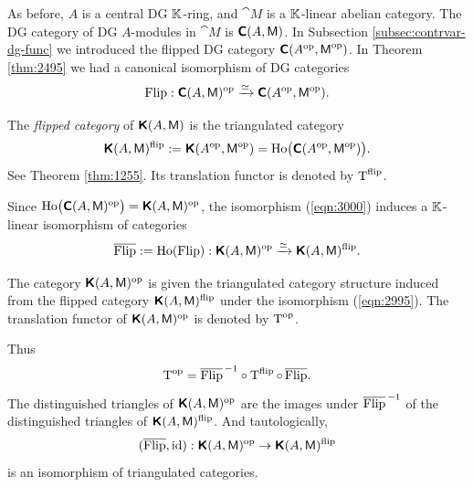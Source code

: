 As before, $A$ is a central DG $\mathbb{K}$-ring, and $\cat{M}$ is a $\mathbb{K}$-linear 
abelian category. The DG category of DG $A$-modules in $\cat{M}$ is 
$\boldsymbol{\mathsf{C}}(A, \operatorname{\mathsf{M}})$. 
In Subsection \ref{subsec:contrvar-dg-func} we introduced the flipped DG 
category 
$\boldsymbol{\mathsf{C}}(A^{\mathrm{op}}, \operatorname{\mathsf{M}}^{\mathrm{op}})$. 
In Theorem \ref{thm:2495} we had a canonical isomorphism of DG categories
\begin{equation} \label{eqn:3000}
\operatorname{Flip} : 
\boldsymbol{\mathsf{C}}(A, \operatorname{\mathsf{M}})^{\mathrm{op}} \xrightarrow{\simeq} 
\boldsymbol{\mathsf{C}}(A^{\mathrm{op}}, \operatorname{\mathsf{M}}^{\mathrm{op}}) . 
\end{equation}

\begin{dfn} \label{dfn:2375}
The {\em flipped category}
of $\boldsymbol{\mathsf{K}}(A, \operatorname{\mathsf{M}})$ is the triangulated category 
\[ \boldsymbol{\mathsf{K}}(A, \operatorname{\mathsf{M}})^{\mathrm{flip}} :=
\boldsymbol{\mathsf{K}}(A^{\mathrm{op}}, \operatorname{\mathsf{M}}^{\mathrm{op}}) = 
\operatorname{Ho} \bigl( \boldsymbol{\mathsf{C}}(A^{\mathrm{op}}, \operatorname{\mathsf{M}}^{\mathrm{op}}) \bigr) . \]
See Theorem \ref{thm:1255}. Its translation functor is denoted by 
$\operatorname{T}^{\mathrm{flip}}$. 
\end{dfn}

Since 
$\operatorname{Ho} \bigl( \boldsymbol{\mathsf{C}}(A, \operatorname{\mathsf{M}})^{\mathrm{op}} \bigr) = 
\boldsymbol{\mathsf{K}}(A, \operatorname{\mathsf{M}})^{\mathrm{op}}$,
the isomorphism (\ref{eqn:3000}) 
induces a $\mathbb{K}$-linear isomorphism of categories 
\begin{equation} \label{eqn:2995}
\overline{\operatorname{Flip}} := \operatorname{Ho}(\operatorname{Flip}) :  
\boldsymbol{\mathsf{K}}(A, \operatorname{\mathsf{M}})^{\mathrm{op}} \xrightarrow{\simeq} \boldsymbol{\mathsf{K}}(A, \operatorname{\mathsf{M}})^{\mathrm{flip}} .
\end{equation}

\begin{dfn} \label{dfn:2995}
The category $\boldsymbol{\mathsf{K}}(A, \operatorname{\mathsf{M}})^{\mathrm{op}}$
is given the triangulated 
category structure induced from the flipped category 
$ \boldsymbol{\mathsf{K}}(A, \operatorname{\mathsf{M}})^{\mathrm{flip}}$
under the isomorphism (\ref{eqn:2995}). 
The translation functor of $\boldsymbol{\mathsf{K}}(A, \operatorname{\mathsf{M}})^{\mathrm{op}}$ is denoted by 
$\operatorname{T}^{\mathrm{op}}$.
\end{dfn}

Thus 
\begin{equation} \label{eqn:3001}
\operatorname{T}^{\mathrm{op}} = \overline{\operatorname{Flip}}^{\, -1} \circ 
\operatorname{T}^{\mathrm{flip}} \circ \, \overline{\operatorname{Flip}} .
\end{equation}
The distinguished triangles of $\boldsymbol{\mathsf{K}}(A, \operatorname{\mathsf{M}})^{\mathrm{op}}$
are the images under $\overline{\operatorname{Flip}}^{\, -1}$ of the distinguished triangles 
of $ \boldsymbol{\mathsf{K}}(A, \operatorname{\mathsf{M}})^{\mathrm{flip}}$.
And tautologically, 
\begin{equation} \label{eqn:3002}
(\overline{\operatorname{Flip}}, \operatorname{id}) : 
\boldsymbol{\mathsf{K}}(A, \operatorname{\mathsf{M}})^{\mathrm{op}} \to  \boldsymbol{\mathsf{K}}(A, \operatorname{\mathsf{M}})^{\mathrm{flip}}
\end{equation}
is an isomorphism of triangulated categories. 

